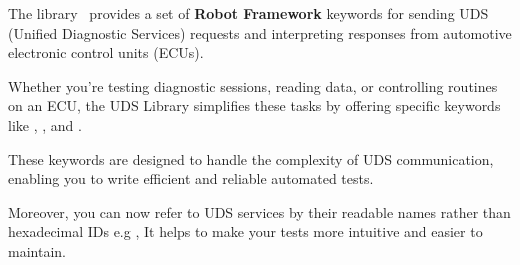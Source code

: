 



The library \pkg\ provides a set of \textbf{Robot Framework} keywords 
for sending UDS (Unified Diagnostic Services) requests and interpreting 
responses from automotive electronic control units (ECUs).

Whether you're testing diagnostic sessions, reading data, or controlling 
routines on an ECU, the UDS Library simplifies these tasks by offering specific 
keywords like , , 
and . 

These keywords are designed to handle the complexity of UDS communication, 
enabling you to write efficient and reliable automated tests.

Moreover, you can now refer to UDS services by their readable names rather than 
hexadecimal IDs e.g , 
It helps to make your tests more intuitive and easier to maintain.